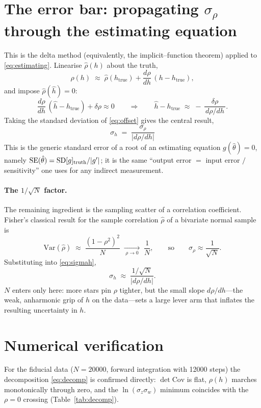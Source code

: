 \documentclass[11pt]{article}
\newcommand{\htrue}{h_{\mathrm{true}}}
\newcommand{\hhat}{\hat h}
\newcommand{\dz}{\sigma_z}
\newcommand{\dw}{\sigma_w}
\newcommand{\rhohat}{\hat\rho}
\newcommand{\Cov}{\mathrm{Cov}}
\begin{document}
\section{The error bar: propagating $\sigma_\rho$ through the estimating equation}
This is the delta method (equivalently, the implicit--function theorem) applied
to \eqref{eq:estimating}. Linearise $\rhohat(h)$ about the truth,
\begin{equation}
  \rhohat(h) \;\approx\; \rhohat(\htrue) + \frac{d\rho}{dh}\,(h-\htrue),
\end{equation}
and impose $\rhohat(\hhat)=0$:
\begin{equation}
  \frac{d\rho}{dh}\,(\hhat-\htrue) + \delta\rho \approx 0
  \qquad\Longrightarrow\qquad
  \hhat-\htrue \;\approx\; -\,\frac{\delta\rho}{\,d\rho/dh\,}.
  \label{eq:offset}
\end{equation}
Taking the standard deviation of \eqref{eq:offset} gives the central result,
\begin{equation}
  \boxed{\;\sigma_h \;=\; \frac{\sigma_\rho}{\left|d\rho/dh\right|}\;}
  \label{eq:sigmah}
\end{equation}
This is the generic standard error of a root of an estimating equation
$g(\hat\theta)=0$, namely $\mathrm{SE}(\hat\theta)=\mathrm{SD}[g]_{\rm truth}/|g'|$;
it is the same ``output error $=$ input error $/$ sensitivity'' one uses for any
indirect measurement.

\paragraph{The $1/\sqrt N$ factor.} The remaining ingredient is the sampling
scatter of a correlation coefficient. Fisher's classical result for the sample
correlation $\hat\rho$ of a bivariate normal sample is
\begin{equation}
  \mathrm{Var}(\hat\rho) \;\approx\; \frac{(1-\rho^2)^2}{N}
  \;\xrightarrow[\;\rho\to0\;]{}\; \frac1N,
  \qquad\text{so}\qquad \sigma_\rho \approx \frac{1}{\sqrt N}.
\end{equation}
Substituting into \eqref{eq:sigmah},
\begin{equation}
  \sigma_h \;\approx\; \frac{1/\sqrt N}{\left|d\rho/dh\right|}.
  \label{eq:sigmah_N}
\end{equation}
$N$ enters only here: more stars pin $\rho$ tighter, but the small slope
$d\rho/dh$---the weak, anharmonic grip of $h$ on the data---sets a large lever
arm that inflates the resulting uncertainty in $h$.

\section{Numerical verification}
For the fiducial data ($N=\num{20000}$, forward integration with
\num{12000} steps) the decomposition \eqref{eq:decomp} is confirmed directly:
$\det\Cov$ is flat, $\rho(h)$ marches monotonically through zero, and the
$\ln(\dz\dw)$ minimum coincides with the $\rho=0$ crossing
(Table~\ref{tab:decomp}).
\end{document}
